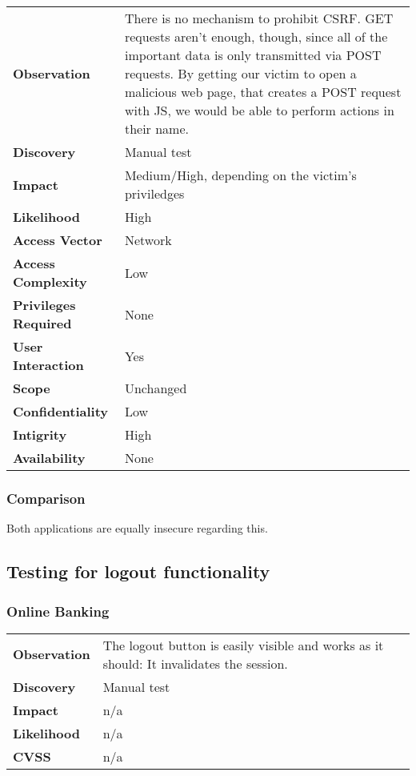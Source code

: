 \begin{tabular}{l|p{10cm}}
\textbf{Observation} & There is no mechanism to prohibit CSRF. GET requests aren't enough, though, since all of the important data is only transmitted via POST requests. By getting our victim to open a malicious web page, that creates a POST request with JS, we would be able to perform actions in their name. \\
\textbf{Discovery} & Manual test \\
\textbf{Impact} & Medium/High, depending on the victim's priviledges \\
\textbf{Likelihood} & High \\
\textbf{Access Vector} & Network \\
\textbf{Access Complexity} & Low\\
\textbf{Privileges Required} & None \\
\textbf{User Interaction} & Yes \\
\textbf{Scope} & Unchanged \\
\textbf{Confidentiality} & Low \\
\textbf{Intigrity} & High\\
\textbf{Availability} & None \\
\end{tabular}

\subsubsection*{Comparison}
Both applications are equally insecure regarding this.

\clearpage


\subsection{Testing for logout functionality}

\subsubsection*{Online Banking}

\begin{tabular}{l|p{10cm}}
\textbf{Observation} & The logout button is easily visible and works as it should: It invalidates the session. \\
\textbf{Discovery} & Manual test \\
\textbf{Impact} & n/a \\
\textbf{Likelihood} & n/a \\
\textbf{CVSS} & n/a \\
\end{tabular}

